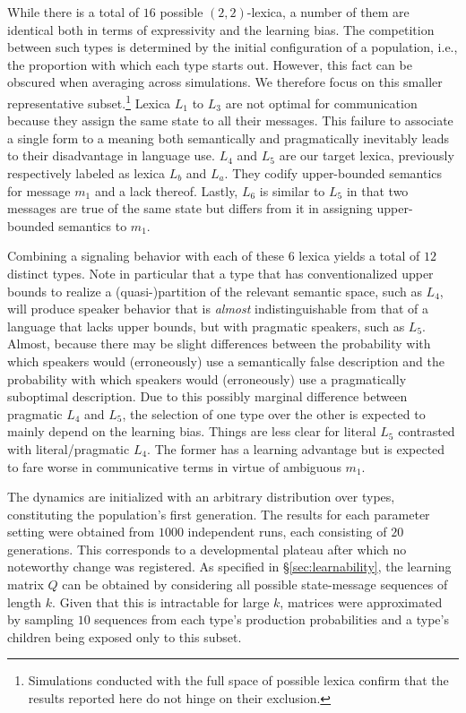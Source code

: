 \documentclass[a4paper]{article}
\begin{document}
While there is a total of $16$ possible $(2,2)$-lexica, a number of them are identical both in terms of expressivity and the learning bias. The competition between such types is determined by the initial configuration of a population, i.e., the proportion with which each type starts out. However, this fact can be obscured when averaging across simulations. We therefore focus on this smaller representative subset.\footnote{Simulations conducted with the full space of possible lexica confirm that the results reported here do not hinge on their exclusion.} Lexica $L_1$ to $L_3$ are not optimal for communication because they assign the same state to all their messages. This failure to associate a single form to a meaning both semantically and pragmatically inevitably leads to their disadvantage in language use. $L_4$ and $L_5$ are our target lexica, previously respectively labeled as lexica $L_b$ and $L_a$. They codify upper-bounded semantics for message $m_1$ and a lack thereof. Lastly, $L_6$ is similar to $L_5$ in that two messages are true of the same state but differs from it in assigning upper-bounded semantics to $m_1$. 


Combining a signaling behavior with each of these $6$ lexica yields a total of $12$ distinct types. Note in particular  that a type that has conventionalized upper bounds to realize a (quasi-)partition of the relevant semantic space, such as $L_4$, will produce speaker behavior that is {\em almost} indistinguishable from that of a language that lacks upper bounds, but with pragmatic speakers, such as $L_5$. Almost, because there may be slight differences between the probability with which speakers would (erroneously) use a semantically false description and the probability with which speakers would (erroneously) use a pragmatically suboptimal description. Due to this possibly marginal difference between pragmatic $L_4$ and $L_5$, the selection of one type over the other is expected to mainly depend on the learning bias. Things are less clear for literal $L_5$ contrasted with literal/pragmatic $L_4$. The former has a learning advantage but is expected to fare worse in communicative  terms in virtue of ambiguous $m_1$.


The dynamics are initialized with an arbitrary distribution over types, constituting the population's first generation. The results for each parameter setting were obtained from $1000$ independent runs, each consisting of $20$ generations. This corresponds to a developmental plateau after which no noteworthy change was registered. As specified in \S\ref{sec:learnability}, the learning matrix $Q$ can be obtained by considering all possible state-message sequences of length $k$. Given that this is intractable for large $k$, matrices were approximated by sampling $10$ sequences from each type's production probabilities and a type's children being exposed only to this subset. 
\end{document}
